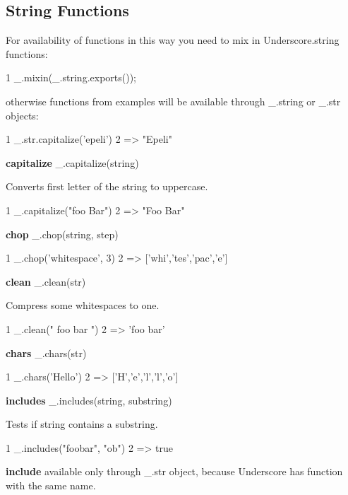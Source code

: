 \subsection*{String Functions}

For availability of functions in this way you need to mix in Underscore.\+string functions\+:


\begin{DoxyCode}
1 \_.mixin(\_.string.exports());
\end{DoxyCode}


otherwise functions from examples will be available through \+\_\+.\+string or \+\_\+.\+str objects\+:


\begin{DoxyCode}
1 \_.str.capitalize('epeli')
2 => "Epeli"
\end{DoxyCode}


{\bfseries capitalize} \+\_\+.\+capitalize(string)

Converts first letter of the string to uppercase.


\begin{DoxyCode}
1 \_.capitalize("foo Bar")
2 => "Foo Bar"
\end{DoxyCode}


{\bfseries chop} \+\_\+.\+chop(string, step)


\begin{DoxyCode}
1 \_.chop('whitespace', 3)
2 => ['whi','tes','pac','e']
\end{DoxyCode}


{\bfseries clean} \+\_\+.\+clean(str)

Compress some whitespaces to one.


\begin{DoxyCode}
1 \_.clean(" foo    bar   ")
2 => 'foo bar'
\end{DoxyCode}


{\bfseries chars} \+\_\+.\+chars(str)


\begin{DoxyCode}
1 \_.chars('Hello')
2 => ['H','e','l','l','o']
\end{DoxyCode}


{\bfseries includes} \+\_\+.\+includes(string, substring)

Tests if string contains a substring.


\begin{DoxyCode}
1 \_.includes("foobar", "ob")
2 => true
\end{DoxyCode}


{\bfseries include} available only through \+\_\+.\+str object, because Underscore has function with the same name.


